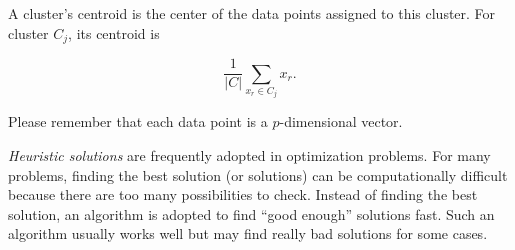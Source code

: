 A cluster's centroid is  the center of the data points assigned to this cluster.
For cluster $C_j$, its centroid is 

\begin{equation}
  \frac{1}{|C|} \underset{x_r \in C_j}{\sum} x_r.
  \label{equ:kmean:centroid}
\end{equation}  

Please remember that each data point is a $p$-dimensional vector.

{\it Heuristic solutions} are frequently adopted in optimization
  problems.  For many problems, finding the best solution (or
  solutions) can be computationally difficult because there are too
  many possibilities to check.  Instead of finding the best solution,
  an algorithm is adopted to find ``good enough'' solutions fast. Such
  an algorithm usually works well but may find really bad solutions
  for some cases.  


